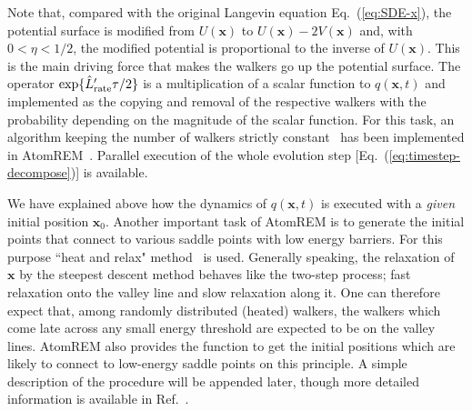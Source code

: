 \documentclass[preprint,12pt]{elsarticle}
\begin{document}
Note that, compared with the original Langevin equation Eq.~(\ref{eq:SDE-x}), the potential surface is modified from $U({\bm x})$ to $U({\bm x})-2V({\bm x})$ and, with $0<\eta<1/2$, the modified potential is proportional to the inverse of $U({\bm x})$. This is the main driving force that makes the walkers go up the potential surface. The operator ${\rm exp}\{\hat{L}'_{\rm rate} \tau/2\}$ is a multiplication of a scalar function to $q({\bm x}, t)$ and implemented as the copying and removal of the respective walkers with the probability depending on the magnitude of the scalar function. For this task, an algorithm keeping the number of walkers strictly constant~\cite{conservation_walkers} has been implemented in AtomREM~\cite{Nagornov}. Parallel execution of the whole evolution step [Eq.~(\ref{eq:timestep-decompose})] is available.

We have explained above how the dynamics of $q({\bm x}, t)$ is executed with a {\it given} initial position ${\bm x}_{0}$. Another important task of AtomREM is to generate the initial points that connect to various saddle points with low energy barriers. For this purpose ``heat and relax" method~\cite{Nagornov} is used. Generally speaking, the relaxation of ${\bm x}$ by the steepest descent method behaves like the two-step process; fast relaxation onto the valley line and slow relaxation along it. One can therefore expect that, among randomly distributed (heated) walkers, the walkers which come late across any small energy threshold are expected to be on the valley lines. AtomREM also provides the function to get the initial positions which are likely to connect to low-energy saddle points on this principle. A simple description of the procedure will be appended later, though more detailed information is available in Ref.~\cite{Nagornov}.



\end{document}
